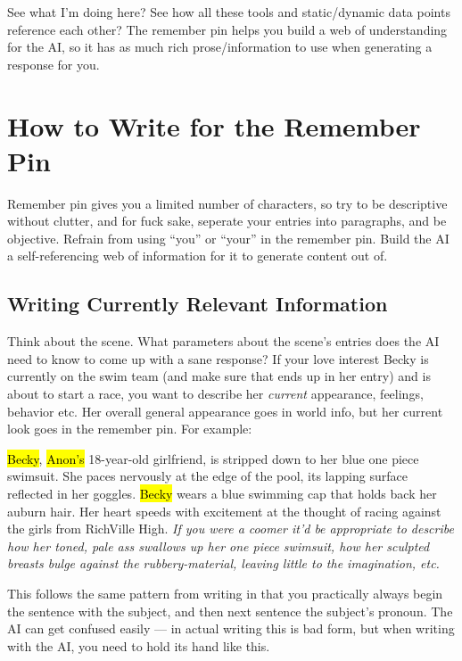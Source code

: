 \documentclass[Avsfag-main.tex]{subfiles}
\begin{document}
See what I'm doing here?
See how all these tools and static/dynamic data points reference each other?
The remember pin helps you build a web of understanding for the AI, so it has as much rich prose/information to use when generating a response for you.

\section{How to Write for the Remember Pin}

Remember pin gives you a limited number of characters, so try to be descriptive without clutter, and for fuck sake, seperate your entries into paragraphs, and be objective.
Refrain from using ``you'' or ``your'' in the remember pin.
Build the AI a self-referencing web of information for it to generate content out of.

\subsection{Writing Currently Relevant Information}

Think about the scene.
What parameters about the scene's \wi entries does the AI need to know to come up with a sane response?
If your love interest Becky is currently on the swim team (and make sure that ends up in her \wi entry) and is about to start a race, you want to describe her \emph{current} appearance, feelings, behavior etc.
Her overall general appearance goes in world info, but her current look goes in the remember pin.
For example:

\begin{/rm}
\hl{Becky}, \hl{Anon's} 18-year-old girlfriend, is stripped down to her blue one piece swimsuit.
She paces nervously at the edge of the pool, its lapping surface reflected in her goggles.
\hl{Becky} wears a blue swimming cap that holds back her auburn hair.
Her heart speeds with excitement at the thought of racing against the girls from RichVille High.
\tcblower
\em \small If you were a coomer it'd be appropriate to describe how her toned, pale ass swallows up her one piece swimsuit, how her sculpted breasts bulge against the rubbery-material, leaving little to the imagination, etc.
\end{/rm}

This follows the same pattern from writing \wi in that you practically always begin the sentence with the subject, and then next sentence the subject's pronoun.
The AI can get confused easily — in actual writing this is bad form, but when writing with the AI, you need to hold its hand like this.
\end{document}
